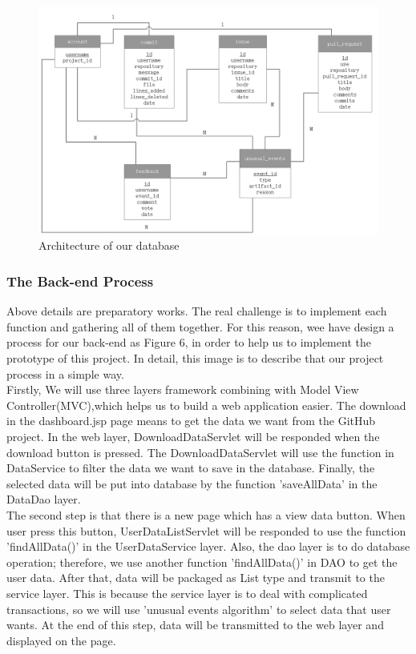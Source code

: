 \documentclass[conference]{IEEEtran}
\begin{document}
\begin{figure}[!ht]
\centering
\includegraphics[scale=0.4]{database}
\caption{Architecture of our database}
\end{figure}

\subsubsection{The Back-end Process}
Above details are preparatory works. The real challenge is to implement each function and gathering all of them together. For this reason, wee have design a process for our back-end as Figure 6, in order to help us to implement the prototype of this project. In detail, this image is to describe that our project process in a simple way.\\

Firstly, We will use three layers framework combining with Model View Controller(MVC),which helps us to build a web application easier. The download in the dashboard.jsp page means to get the data we want from the GitHub project. In the web layer, DownloadDataServlet will be responded when the download button is pressed. The DownloadDataServlet will use the function in DataService to filter the data we want to save in the database. Finally, the selected data will be put into database by the function 'saveAllData' in the DataDao layer.\\

The second step is that there is a new page which has a view data button. When user press this button, UserDataListServlet will be responded to use the function 'findAllData()' in the UserDataService layer. Also, the dao layer is to do database operation; therefore, we use another function 'findAllData()' in DAO to get the user data. After that, data will be packaged as List type and transmit to the service layer. This is because the service layer is to deal with complicated transactions, so we will use 'unusual events algorithm' to select data that user wants. At the end of this step, data will be transmitted to the web layer and displayed on the page.
\end{document}

